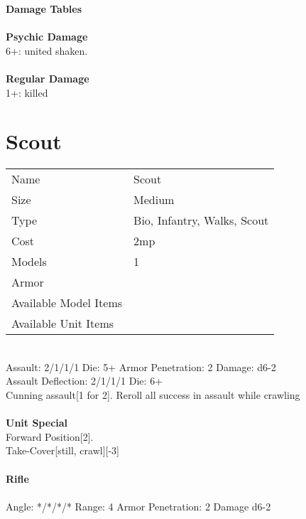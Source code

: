 {\bf Damage Tables} \\
\ \\ {\bf Psychic Damage } \\
6+: united shaken. \\
\ \\ {\bf Regular Damage } \\
1+: killed \\









\pagebreak

\section{ Scout }

\begin{tabular}{ll}
  Name & Scout \\
  Size & Medium\\
  Type & Bio, Infantry, Walks, Scout\\
  Cost & 2mp\\
  Models & 1\\
  Armor & \\
  Available Model Items &  \\
  Available Unit Items &  \\
\end{tabular}

\ \\
Assault: 2/1/1/1 Die: 5+ Armor Penetration: 2 Damage: d6-2 \\
Assault Deflection: 2/1/1/1 Die: 6+\\
\indent Cunning assault[1 for 2]. Reroll all success in assault while crawling \\
\ \\

{\bf Unit Special} \\
Forward Position[2]. \\ Take-Cover[still, crawl][-3]
\ \\
\ \\
{\bf Rifle } \\
\ \\
Angle: */*/*/* Range: 4 Armor Penetration: 2 Damage d6-2 \\
\indent  \\





